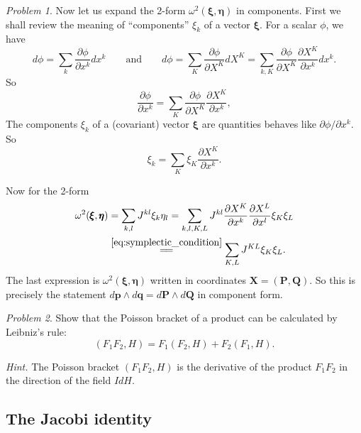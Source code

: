 \documentclass{book}
\numberwithin{equation}{section}
\theoremstyle{plain}
\theoremstyle{definition}
\theoremstyle{remark}
\theoremstyle{smallcap}
\newtheorem{prob}{Problem}
\numberwithin{prob}{section}
\newcommand{\hint}[1]{\textit{Hint.} #1}
\begin{document}
\begin{prob}
{{      Now let us expand the 2-form $\omega^2(\pmb\xi,\pmb\eta)$
      in components.
      First we shall review the meaning of ``components'' $\xi_k$ of a vector $\pmb\xi$.
      For a scalar $\phi$, we have
      $$
      d\phi = \sum_k \frac{ \partial \phi } { \partial x^k } dx^k
      \qquad \mathrm{and} \qquad
      d\phi
      = \sum_K \frac{ \partial \phi } { \partial X^K } dX^K
      = \sum_{k, K} \frac{ \partial \phi } { \partial X^K }
      \frac{ \partial X^K } { \partial x^k } d x^k.
      $$
      So
      $$
      \frac{ \partial \phi } { \partial x^k }
      =
      \sum_K \frac{ \partial \phi } { \partial X^K } \frac { \partial X^K } { \partial x^k },
      $$
      The components $\xi_k$ of a (covariant) vector $\pmb\xi$ are quantities
      behaves like $\partial \phi/\partial x^k$.  So
      $$
      \xi_k = \sum_K \xi_K \frac { \partial X^K } { \partial x^k }.
      $$

      Now for the 2-form
      $$
      \begin{aligned}
      \omega^2(\pmb\xi, \pmb\eta)
      &=
      \sum_{k,l} J^{kl} \xi_k \eta_l
      =
      \sum_{k,l,K,L} J^{kl} \frac{ \partial X^K } { \partial x^k }
        \frac{ \partial X^L } { \partial x^l } \xi_K \xi_L \\
      &\stackrel{\eqref{eq:symplectic_condition}}{=\joinrel=}
      \sum_{K,L} J^{KL} \xi_K \xi_L.
      \end{aligned}
      $$
      The last expression is $\omega^2(\pmb\xi, \pmb\eta)$
      written in coordinates $\mathbf X = (\mathbf P, \mathbf Q)$.
      So this is precisely the statement
      $d\mathbf p \wedge d\mathbf q = d\mathbf P \wedge d\mathbf Q$
      in component form.
    }
  }
\end{prob}

\begin{prob}
  Show that the Poisson bracket of a product can be calculated by Leibniz's rule:
  $$
  (F_1 F_2, H) = F_1 (F_2, H) + F_2 (F_1, H).
  $$

  \hint{The Poisson bracket $(F_1 F_2, H)$ is the derivative of the product $F_1 F_2$
  in the direction of the field $IdH$.}

\end{prob}


\subsection{The Jacobi identity}
\end{document}

